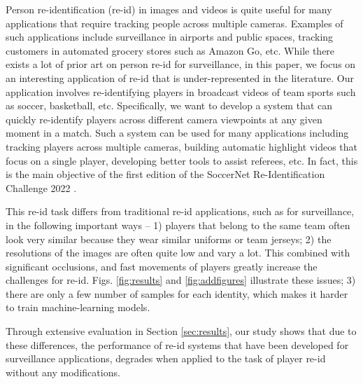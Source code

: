 \documentclass{article}
\begin{document}
Person re-identification (re-id) in images and videos is quite useful for many applications that require tracking people across multiple cameras. Examples of such applications include surveillance in airports and public spaces, tracking customers in automated grocery stores such as Amazon Go, etc. While there exists a lot of prior art on person re-id for surveillance, in this paper, we focus on an interesting application of re-id that is under-represented in the literature. Our application involves re-identifying players in broadcast videos of team sports such as soccer, basketball, etc. Specifically, we want to develop a system that can quickly re-identify players across different camera viewpoints at any given moment in a match. Such a system can be used for many applications including tracking players across multiple cameras, building automatic highlight videos that focus on a single player, developing better tools to assist referees, etc. In fact, this is the main objective of the first edition of the SoccerNet Re-Identification Challenge 2022 \cite{soccerNetv3,soccerNetv2}.

This re-id task differs from traditional re-id applications, such as for surveillance, in the following important ways -- 1) players that belong to the same team often look very similar because they wear similar uniforms or team jerseys; 2) the resolutions of the images are often quite low and vary a lot. This combined with significant occlusions, and fast movements of players greatly increase the challenges for re-id. Figs. \ref{fig:results} and \ref{fig:addfigures} illustrate these issues; 3) there are only a few number of samples for each identity, which makes it harder to train machine-learning models.

Through extensive evaluation in Section \ref{sec:results}, our study shows that due to these differences, the performance of re-id systems that have been developed for surveillance applications, degrades when applied to the task of player re-id without any modifications.
\end{document}
